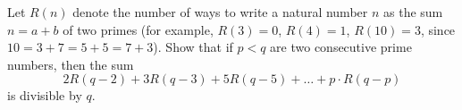 \problem
Let $R(n)$ denote the number of ways to write a natural number $n$ as the sum $n = a + b$ of two primes (for example, $R(3) = 0$, $R(4) = 1$, $R(10) = 3$, since $10 = 3 + 7 = 5 + 5 = 7 + 3$).
Show that if $p < q$ are two consecutive prime numbers, then the sum
\[
    2 R (q - 2) + 3 R (q - 3) + 5 R (q - 5) + \ldots + p \cdot R (q - p)
\]
is divisible by $q$.
\solution
\endproblem
